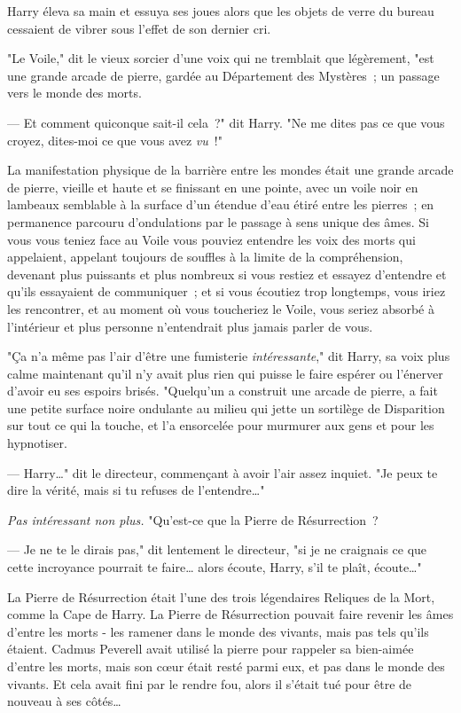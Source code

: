 Harry éleva sa main et essuya ses joues alors que les objets de verre du bureau cessaient de vibrer sous l'effet de son dernier cri.

"Le Voile," dit le vieux sorcier d'une voix qui ne tremblait que légèrement, "est une grande arcade de pierre, gardée au Département des Mystères~; un passage vers le monde des morts.

--- Et comment quiconque sait-il cela~?" dit Harry. "Ne me dites pas ce que vous croyez, dites-moi ce que vous avez \emph{vu}~!"

La manifestation physique de la barrière entre les mondes était une grande arcade de pierre, vieille et haute et se finissant en une pointe, avec un voile noir en lambeaux semblable à la surface d'un étendue d'eau étiré entre les pierres~; en permanence parcouru d'ondulations par le passage à sens unique des âmes. Si vous vous teniez face au Voile vous pouviez entendre les voix des morts qui appelaient, appelant toujours de souffles à la limite de la compréhension, devenant plus puissants et plus nombreux si vous restiez et essayez d'entendre et qu'ils essayaient de communiquer~; et si vous écoutiez trop longtemps, vous iriez les rencontrer, et au moment où vous toucheriez le Voile, vous seriez absorbé à l'intérieur et plus personne n'entendrait plus jamais parler de vous.

"Ça n'a même pas l'air d'être une fumisterie \emph{intéressante}," dit Harry, sa voix plus calme maintenant qu'il n'y avait plus rien qui puisse le faire espérer ou l'énerver d'avoir eu ses espoirs brisés. "Quelqu'un a construit une arcade de pierre, a fait une petite surface noire ondulante au milieu qui jette un sortilège de Disparition sur tout ce qui la touche, et l'a ensorcelée pour murmurer aux gens et pour les hypnotiser.

--- Harry…" dit le directeur, commençant à avoir l'air assez inquiet. "Je peux te dire la vérité, mais si tu refuses de l'entendre…"

\emph{Pas intéressant non plus.} "Qu'est-ce que la Pierre de Résurrection~?

--- Je ne te le dirais pas," dit lentement le directeur, "si je ne craignais ce que cette incroyance pourrait te faire… alors écoute, Harry, s'il te plaît, écoute…"

La Pierre de Résurrection était l'une des trois légendaires Reliques de la Mort, comme la Cape de Harry. La Pierre de Résurrection pouvait faire revenir les âmes d'entre les morts - les ramener dans le monde des vivants, mais pas tels qu'ils étaient. Cadmus Peverell avait utilisé la pierre pour rappeler sa bien-aimée d'entre les morts, mais son cœur était resté parmi eux, et pas dans le monde des vivants. Et cela avait fini par le rendre fou, alors il s'était tué pour être de nouveau à ses côtés…

